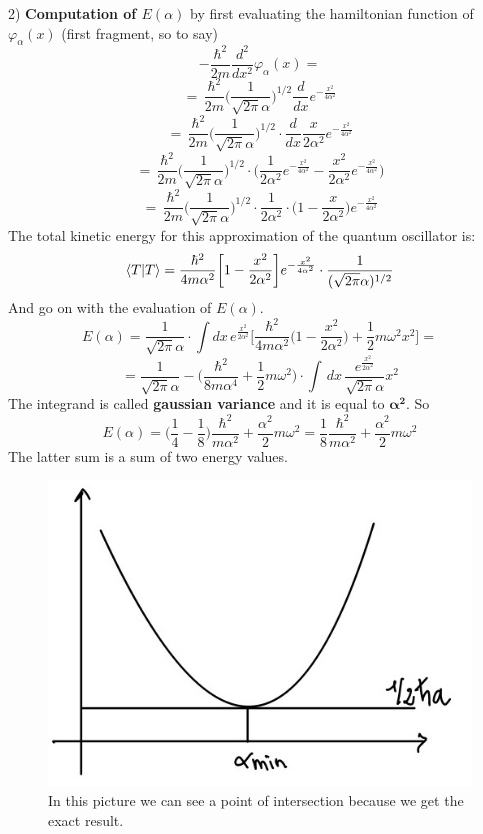 2) \textbf{Computation of $E(\alpha)$} by first evaluating the hamiltonian function of $\varphi_{\alpha}(x)$ (first fragment, so to say)
\[
-\frac{\hbar^2}{2m}\frac{d^2}{dx^2}\varphi_{\alpha}(x)=
\]
\[
=\,\frac{\hbar^2}{2m}\bigg(\frac{1}{\sqrt{2\pi}\alpha}\bigg)^{1/2}\frac{d}{dx}e^{-{\frac{x^2}{4\alpha^2}}}
\]
\[
=\,\frac{\hbar^2}{2m}\bigg(\frac{1}{\sqrt{2\pi}\alpha}\bigg)^{1/2}\cdot\frac{d}{dx}\frac{x}{2\alpha^2}e^{-{\frac{x^2}{4\alpha^2}}}
\]
\[
=\,\frac{\hbar^2}{2m}\bigg(\frac{1}{\sqrt{2\pi}\alpha}\bigg)^{1/2}\cdot\bigg(\frac{1}{2\alpha^2}e^{-{\frac{x^2}{4\alpha^2}}}-\frac{x^2}{2\alpha^2}e^{-\frac{x^2}{4\alpha^2}}\bigg)
\]
\[
=\,\frac{\hbar^2}{2m}\bigg(\frac{1}{\sqrt{2\pi}\alpha}\bigg)^{1/2}\cdot\frac{1}{2\alpha^2}\cdot\bigg(1-\frac{x}{2\alpha^2}\bigg)e^{-{\frac{x^2}{4\alpha^2}}}
\]
The total kinetic energy for this approximation of the quantum oscillator is:
\[
\braket{T}=\frac{\hbar^2}{4m\alpha^2}\bigg[1-\frac{x^2}{2\alpha^2}\bigg]e^{-{\frac{x^2}{4\alpha^2}}}\cdot\frac{1}{(\sqrt{2\pi}\alpha)^{1/2}}
\]
And go on with the evaluation of $E(\alpha)$.
\[
E(\alpha)=\frac{1}{\sqrt{2\pi}\alpha}\cdot \int dx\, e^{\frac{x^2}{2\alpha^2}}\bigg[\frac{\hbar^2}{4m\alpha^2}\bigg(1-\frac{x^2}{2\alpha^2}\bigg)+\frac{1}{2}m\omega^2x^2\bigg]=
\]
\[
=\frac{1}{\sqrt{2\pi}\alpha}-\bigg(\frac{\hbar^2}{8m\alpha^4}+\frac{1}{2}m\omega^2\bigg)\cdot \int\,dx\,\frac{e^{\frac{x^2}{2\alpha^2}}}{\sqrt{2\pi}\alpha}x^2
\]
The integrand is called \textbf{gaussian variance} and it is equal to $\mathbf{\alpha^2}$.
So
\[
E(\alpha)=\bigg(\frac{1}{4}-\frac{1}{8}\bigg)\frac{\hbar^2}{m\alpha^2}+\frac{\alpha^2}{2}m\omega^2 = \frac{1}{8}\frac{\hbar^2}{m\alpha^2}+\frac{\alpha^2}{2}m\omega^2
\]
The latter sum is a sum of two energy values.
\begin{figure}[htbp!]
	\centering
	\includegraphics[scale=0.20]{img_4.jpg}
	\caption{In this picture we can see a point of intersection because we get the exact result.}
	\label{fig:intersect}
\end{figure}
